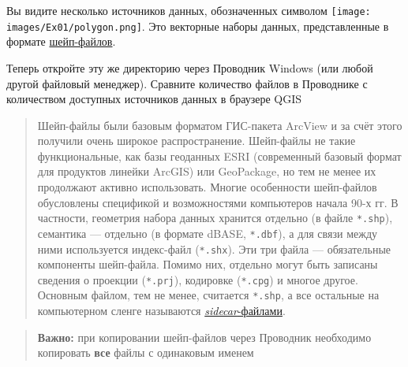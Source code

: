 \documentclass[
  12pt,
]{book}
\begin{document}
Вы видите несколько источников данных, обозначенных символом \texttt{[image: images/Ex01/polygon.png]}. Это векторные наборы данных, представленные в формате \href{https://desktop.arcgis.com/ru/arcmap/latest/manage-data/shapefiles/what-is-a-shapefile.htm}{шейп-файлов}.

Теперь откройте эту же директорию через Проводник Windows (или любой другой файловый менеджер). Сравните количество файлов в Проводнике с количеством доступных источников данных в браузере QGIS

\begin{quote}
Шейп-файлы были базовым форматом ГИС-пакета ArcView и за счёт этого получили очень широкое распространение. Шейп-файлы не такие функциональные, как базы геоданных ESRI (современный базовый формат для продуктов линейки ArcGIS) или GeoPackage, но тем не менее их продолжают активно использовать. Многие особенности шейп-файлов обусловлены спецификой и возможностями компьютеров начала 90-х гг. В частности, геометрия набора данных хранится отдельно (в файле \texttt{*.shp}), семантика --- отдельно (в формате dBASE, \texttt{*.dbf}), а для связи между ними используется индекс-файл (\texttt{*.shx}). Эти три файла --- обязательные компоненты шейп-файла. Помимо них, отдельно могут быть записаны сведения о проекции (\texttt{*.prj}), кодировке (\texttt{*.cpg}) и многое другое. Основным файлом, тем не менее, считается \texttt{*.shp}, а все остальные на компьютерном сленге называются \href{https://en.wikipedia.org/wiki/Sidecar_file}{\emph{sidecar}-файлами}.
\end{quote}

\begin{quote}
\textbf{Важно:} при копировании шейп-файлов через Проводник необходимо копировать \textbf{все} файлы с одинаковым именем
\end{quote}
\end{document}
